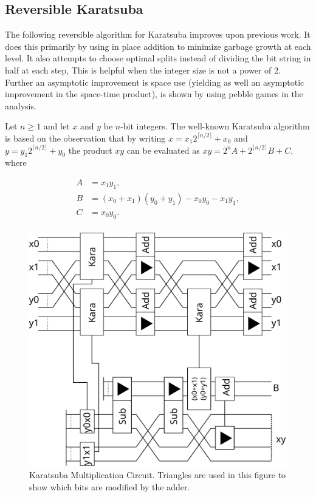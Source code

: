   \subsection{Reversible Karatsuba\label{sec:kara}}

    The following reversible algorithm for Karatsuba improves upon previous
    work\cite{PF:2006}.  It does this primarily by using in place addition to
    minimize garbage growth at each level.  It also attempts to choose optimal
    splits instead of dividing the bit string in half at each
    step, This is helpful when the integer size is not a power of 2. Further an
    asymptotic improvement is space use (yielding as well an asymptotic
    improvement in the space-time product), is shown by using pebble games in
    the analysis. 

    Let $n\geq 1$ and let $x$ and $y$ be $n$-bit integers.  The well-known
    Karatsuba\cite{KO:1963} algorithm is based on the observation that by
    writing $x=x_1 2^{\lceil n/2\rceil}+x_0$ and $y=y_1 2^{\lceil n/2\rceil
    }+y_0$ the product $xy$ can be evaluated as $xy=2^n A + 2^{\rceil n/2
    \rceil} B + C$, where

    \begin{align*}
      A &= x_1 y_1, \\
      B &= (x_0+x_1)(y_0+y_1) - x_0 y_0 - x_1 y_1,\\
      C &= x_0 y_0. \\
    \end{align*}
    \begin{figure}[ht]
      \capstart
      \centering
      \includegraphics[width=2\textwidth/3]{images/karatsuba2}
      \caption{Karatsuba Multiplication Circuit. Triangles are used in this figure to show which bits are modified by the adder.}
      \label{fig:kara2}
     \end{figure}

